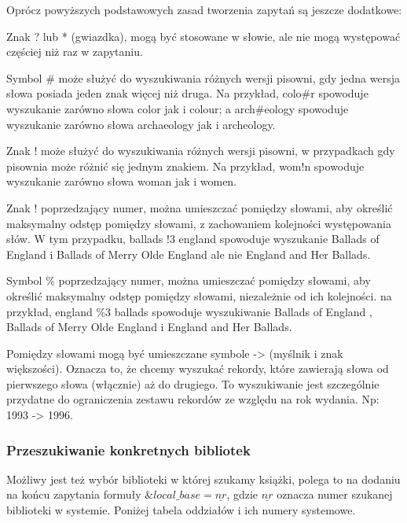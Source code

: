 \documentclass{report}
\begin{document}
				Oprócz powyższych podstawowych zasad tworzenia zapytań są jeszcze dodatkowe:
				
				Znak ? lub * (gwiazdka), mogą być stosowane w słowie, ale nie mogą występować częściej niż raz w zapytaniu.
				
				Symbol \# może służyć do wyszukiwania różnych wersji pisowni, gdy jedna wersja słowa posiada jeden znak więcej niż druga. Na przykład, colo\#r spowoduje wyszukanie zarówno słowa color jak i colour; a arch\#eology spowoduje wyszukanie zarówno słowa archaeology jak i archeology.
				
				Znak ! może służyć do wyszukiwania różnych wersji pisowni, w przypadkach gdy pisownia może różnić się jednym znakiem. Na przykład, wom!n spowoduje wyszukanie zarówno słowa woman jak i women.
				
				Znak ! poprzedzający numer, można umieszczać pomiędzy słowami, aby określić maksymalny odstęp pomiędzy słowami, z zachowaniem kolejności występowania słów. W tym przypadku, ballads !3 england spowoduje wyszukanie Ballads of England i Ballads of Merry Olde England ale nie England and Her Ballads.
				
				Symbol \% poprzedzający numer, można umieszczać pomiędzy słowami, aby określić maksymalny odstęp pomiędzy słowami, niezależnie od ich kolejności. na przykład, england \%3 ballads spowoduje wyszukiwanie Ballads of England , Ballads of Merry Olde England i England and Her Ballads.
				
				Pomiędzy słowami mogą być umieszczane symbole -> (myślnik i znak większości). Oznacza to, że chcemy wyszukać rekordy, które zawierają słowa od pierwszego słowa (włącznie) aż do drugiego. To wyszukiwanie jest szczególnie przydatne do ograniczenia zestawu rekordów ze względu na rok wydania. Np: 1993 -> 1996.
				
			\subsubsection{Przeszukiwanie konkretnych bibliotek}
				
				Możliwy jest też wybór biblioteki w której szukamy książki, polega to na dodaniu na końcu zapytania formuły $\&local\_base=\underline{nr}$, gdzie  $\underline{nr}$ oznacza numer szukanej biblioteki w systemie. Poniżej tabela oddziałów i ich numery systemowe.
				
\end{document}
